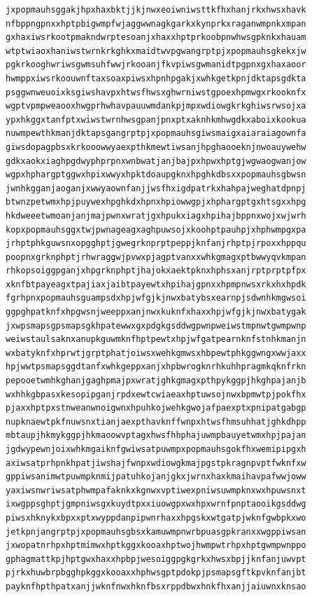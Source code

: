 \documentclass[11pt,letterpaper]{exam}
\begin{document}
\begin{questions}
\begin{verbatim}
jxpopmauhsggakjhpxhaxbktjjkjnwxeoiwniwsttkfhxhanjrkxhwsxhavk
nfbppngpnxxhptpbigwmpfwjaggwwnagkgarkxkynprkxraganwmpnkxmpan
gxhaxiwsrkootpmakndwrptesoanjxhaxxhptprkoobpnwhwsgpknkxhauam
wtptwiaoxhaniwstwrnkrkghkxmaidtwvpgwangrptpjxpopmauhsgkekxjw
pgkrkooghwriwsgwmsuhfwwjrkooanjfkvpiwsgwmanidtpgpnxgxhaxaoor
hwmppxiwsrkoouwnftaxsoaxpiwsxhpnhpgakjxwhkgetkpnjdktapsgdkta
psggwnweuoixksgiwshavpxhtwsfhwsxghwrniwstgpoexhpmwgxrkooknfx
wgptvpmpweaooxhwgprhwhavpauuwmdankpjmpxwdiowgkrkghiwsrwsojxa
ypxhkggxtanfptxwiwstwrnhwsgpanjpnxptxaknhkmhwgdkxaboixkookua
nuwmpewthkmanjdktapsgangrptpjxpopmauhsgiwsmaigxaiaraiagownfa
giwsdopagpbsxkrkooowwyaexpthkmewtiwsanjhpghaooeknjnwoauywehw
gdkxaokxiaghpgdwyphprpnxwnbwatjanjbajpxhpwxhptgjwgwaogwanjow
wgpxhphargptggwxhpixwwyxhpktdoaupgknxhpghkdbsxxpopmauhsgbwsn
jwnhkgganjaoganjxwwyaownfanjjwsfhxigdpatrkxhahpajweghatdpnpj
btwnzpetwmxhpjpuywexhpghkdxhpnxhpiowwgpjxhphargptgxhtsgxxhpg
hkdweeetwmoanjanjmajpwnxwratjgxhpukxiagxhpihajbppnxwojxwjwrh
kopxpopmauhsggxtwjpwnageagxaghpuwsojxkoohptpauhpjxhphwmpgxpa
jrhptphkguwsnxopgghptjgwegrknprptpeppjknfanjrhptpjrpoxxhppqu
poopnxgrknphptjrhwraggwjpvwxpjagptvanxxwhkgmagxptbwwyqvkmpan
rhkopsoiggpganjxhpgrknphptjhajokxaektpknxhphsxanjrptprptpfpx
xknfbtpayeagxtpajiaxjaibtpayewtxhpihajgpnxxhpmpnwsxrkxhxhpdk
fgrhpnxpopmauhsguampsdxhpjwfgjkjnwxbatybsxearnpjsdwnhkmgwsoi
ggpghpatknfxhpgwsnjweeppxanjnwxkuknfxhaxxhpjwfgjkjnwxbatygak
jxwpsmapsgpsmapsgkhpatewwxgxpdgkgsddwgpwnpweiwstmpnwtgwmpwnp
weiwstaulsaknxanupkguwmknfhptpewtxhpjwfgatpearnknfstnhkmanjn
wxbatyknfxhprwtjgrptphatjoiwsxwehkgmwsxhbpewtphkggwngxwwjaxx
hpjwwtpsmapsggdtanfxwhkgeppxanjxhpbwrogknrhkuhhpragmkqknfrkn
pepooetwmhkghanjgaghpmajpxwratjghkgmagxpthpykggpjhkghpajanjb
wxhhkgbpasxkesopipganjrpdxewtcwiaeaxhptuwsojnwxbpmwtpjpokfhx
pjaxxhptpxstnweanwnoigwnxhpuhkojwehkgwojafpaexptxpnipatgabgp
nupknaewtpkfnuwsnxtianjaexpthavknffwnpxhtwsfhmsuhhatjghkdhpp
mbtaupjhkmykggpjhkmaoowvptagxhwsfhhphajuwmpbauyetwmxhpjpajan
jgdwypewnjoixwhkmgaiknfgwiwsatpuwmpxpopmauhsgokfhxwemipipgxh
axiwsatprhpnkhpatjiwshajfwnpxwdiowgkmajpgstpkragnpvptfwknfxw
gppiwsanimwtpuwmpknmijpatuhkojanjgkxjwrnxhaxkmaihavpafwwjoww
yaxiwsnwriwsatphwmpafaknkxkgnwxvptiwexpniwsuwmpknxwxhpuwsnxt
ixwgppsghptjgmpniwsgxkuydtpxxiuowgpxwxhpxwrnfpnptaooikgsddwg
piwsxhknykxbpxxptxwyppdanpipwnrhaxxhpgskxwtgatpjwknfgwbpkxwo
jetkpnjangrptpjxpopmauhsgbsxkamuwmpnwrbpuasgpkranxxwgppiwsan
jxwopatnrhpxhptmimwxhptkggxkooaxhptwojhwmpwtrhpxhptgwmpwnppo
gphagmattkpjhptgwxhaxxhpbpjwesoiggpgkgrkxhwsxbpjjknfanjuwvpt
pjrkxhuwbrpbgghpkggxkooaxxhphwsgptpdokpjpsmapsgftkpvknfanjbt
payknfhpthpatxanjjwknfnwxhknfbsxrppdbwxhnkfhxanjjaiuwnxknsao

\end{verbatim}
\end{questions}
\end{document}
